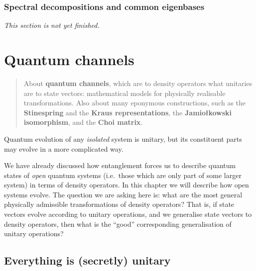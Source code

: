 \documentclass[fleqn,a4paper]{article}
\newenvironment{idea}{\everypar{\setlength{\parindent}{1.5em}}}{}
\newenvironment{todo}{\color{primary}\emph{This section is not yet finished.}}{}
\let\oldsection\section
\renewcommand\section{\clearpage\oldsection}
\theoremstyle{definition}
\theoremstyle{definition}
\theoremstyle{definition}
\theoremstyle{definition}
\theoremstyle{remark}
\begin{document}
\hypertarget{spectral-decompositions-and-common-eigenbases}{%
\subsubsection{Spectral decompositions and common eigenbases}\label{spectral-decompositions-and-common-eigenbases}}

\begin{todo}

\end{todo}

\hypertarget{quantum-channels}{%
\section{Quantum channels}\label{quantum-channels}}

\begin{quote}
About \textbf{quantum channels}, which are to density operators what unitaries are to state vectors: mathematical models for physically realisable transformations.
Also about many eponymous constructions, such as the \textbf{Stinespring} and the \textbf{Kraus representations}, the \textbf{Jamiołkowski isomorphism}, and the \textbf{Choi matrix}.
\end{quote}

\begin{idea}
Quantum evolution of any \emph{isolated} system is unitary, but its constituent parts may evolve in a more complicated way.

\end{idea}

We have already discussed how entanglement forces us to describe quantum states of \emph{open} quantum systems (i.e.~those which are only part of some larger system) in terms of density operators.
In this chapter we will describe how open systems evolve.
The question we are asking here is: what are the most general physically admissible transformations of density operators?
That is, if state vectors evolve according to unitary operations, and we generalise state vectors to density operators, then what is the ``good'' corresponding generalisation of unitary operations?

\hypertarget{everything-is-secretly-unitary}{%
\subsection{Everything is (secretly) unitary}\label{everything-is-secretly-unitary}}
\end{document}
